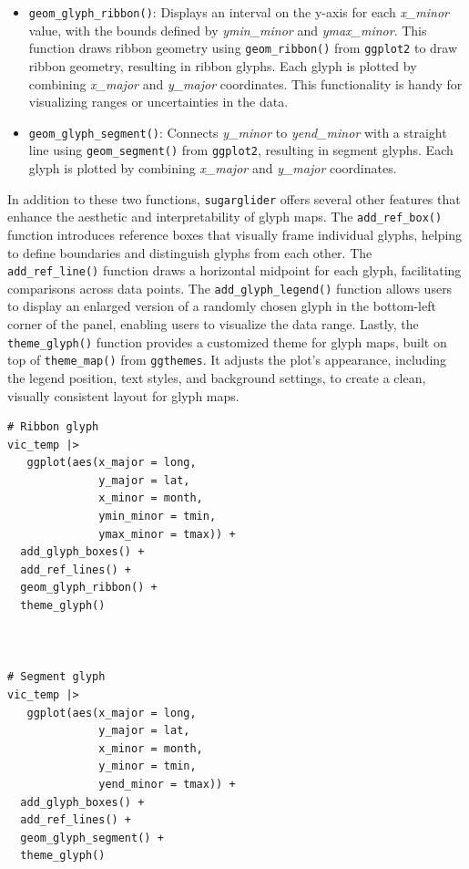 \begin{itemize}
\item
  \texttt{geom\_glyph\_ribbon()}: Displays an interval on the y-axis for each \emph{x\_minor} value, with the bounds defined by \emph{ymin\_minor} and \emph{ymax\_minor}. This function draws ribbon geometry using \texttt{geom\_ribbon()} from \texttt{ggplot2} to draw ribbon geometry, resulting in ribbon glyphs. Each glyph is plotted by combining \emph{x\_major} and \emph{y\_major} coordinates. This functionality is handy for visualizing ranges or uncertainties in the data.
\item
  \texttt{geom\_glyph\_segment()}: Connects \emph{y\_minor} to \emph{yend\_minor} with a straight line using \texttt{geom\_segment()} from \texttt{ggplot2}, resulting in segment glyphs. Each glyph is plotted by combining \emph{x\_major} and \emph{y\_major} coordinates.
\end{itemize}

In addition to these two functions, \texttt{sugarglider} offers several other features that enhance the aesthetic and interpretability of glyph maps. The \texttt{add\_ref\_box()} function introduces reference boxes that visually frame individual glyphs, helping to define boundaries and distinguish glyphs from each other. The \texttt{add\_ref\_line()} function draws a horizontal midpoint for each glyph, facilitating comparisons across data points. The \texttt{add\_glyph\_legend()} function allows users to display an enlarged version of a randomly chosen glyph in the bottom-left corner of the panel, enabling users to visualize the data range. Lastly, the \texttt{theme\_glyph()} function provides a customized theme for glyph maps, built on top of \texttt{theme\_map()} from \texttt{ggthemes}. It adjusts the plot's appearance, including the legend position, text styles, and background settings, to create a clean, visually consistent layout for glyph maps.

\begin{verbatim}
# Ribbon glyph
vic_temp |>
   ggplot(aes(x_major = long,
              y_major = lat,
              x_minor = month,
              ymin_minor = tmin,
              ymax_minor = tmax)) +
  add_glyph_boxes() +
  add_ref_lines() +
  geom_glyph_ribbon() +
  theme_glyph()



# Segment glyph
vic_temp |>
   ggplot(aes(x_major = long,
              y_major = lat,
              x_minor = month,
              y_minor = tmin,
              yend_minor = tmax)) +
  add_glyph_boxes() +
  add_ref_lines() +
  geom_glyph_segment() +
  theme_glyph()
\end{verbatim}

